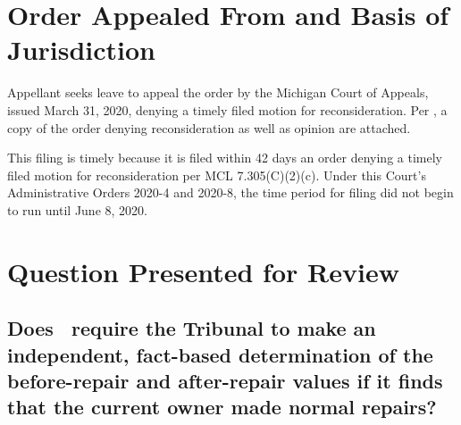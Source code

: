 \documentclass[12pt,\documentclassflag]{michiganCourtOfAppealsBrief}
\begin{document}




\section{Order Appealed From and Basis of Jurisdiction}

Appellant seeks leave to appeal the order by the Michigan Court of Appeals, issued March 31, 2020,
denying a timely filed motion for reconsideration.
Per \cite{MCR 7.305(A)(2)}, a copy of the order denying reconsideration as well as opinion are attached.

This filing is timely because it is filed within 42 days an order denying a timely filed motion for reconsideration per MCL 7.305(C)(2)(c). Under this Court's Administrative Orders 2020-4 and 2020-8, the time period for filing did not begin to run until June 8, 2020.


\newpage
\section{Question Presented for Review}

\subsection{Does \mathieuGast\ require the Tribunal to make
  an independent, fact-based determination of the before-repair and after-repair values 
  if it finds that the current owner made normal repairs?}
\end{document}
